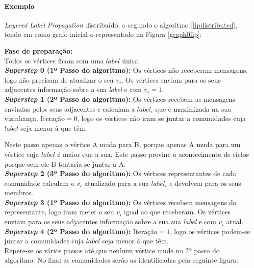 \clearpage

 \paragraph{Exemplo} \textit{Layered Label Propagation} distribuído, o  segundo 
o algoritmo \ref{llpdistributed}, tendo em como grafo inicial o representado na 
Figura \ref{graph0llp}:

{\bf Fase de preparação:}\\
Todos os vértices ficam com uma $label$ única. 
\\[0.25cm]
{\bf \textit{Superstep} 0  (1º Passo do algoritmo):}
Os vértices não receberam mensagens, logo não precisam de atualizar o seu $v_i$.
Os vértices enviam para os seus adjacentes informação sobre a sua 
\textit{label} e com $v_i=1$.
\\[0.25cm]
{\bf \textit{Superstep} 1 (2º Passo do algoritmo):}
Os vértices recebem as mensagens enviadas pelos seus adjacentes e calculam a 
$label_i$ que é maximizada na sua vizinhança. Iteração$ = 0$, 
logo os vértices não iram se juntar a comunidades cuja $label$ seja menor à que 
têm.

Neste passo apenas o vértice A muda para B, porque apenas A muda para um 
vértice cuja $label$ é maior que a sua. Este passo previne o acontecimento de 
ciclos porque sem ele B tentaria-se juntar a A.
\\[0.25cm]
{\bf \textit{Superstep} 2 (3º Passo do algoritmo):} Os vértices representantes 
de cada comunidade calculam o $v_i$ atualizado para a sua $label_i$ e devolvem 
para os seus membros.
\\[0.25cm]
{\bf \textit{Superstep} 3 (1º Passo do algoritmo):}
Os vértices recebem mensagens do representante, logo iram meter o seu $v_i$ 
igual ao que receberam.
Os vértices enviam para os seus adjacentes informação sobre a sua sua 
\textit{label} e com $v_i$ atual.
\\[0.25cm]
{\bf \textit{Superstep} 4 (2º Passo do algoritmo):}
Iteração$ = 1$, 
logo os vértices podem-se juntar a comunidades cuja $label$ seja menor à que 
têm.
\\[0.25cm]
Repete-se os vários passos até que nenhum vértice mude no 2º passo do 
algoritmo. No final as comunidades serão as identificadas pela seguinte figura:


